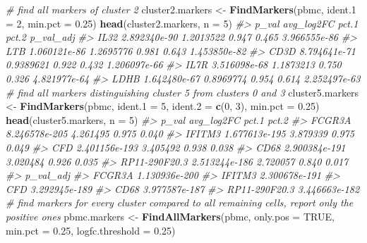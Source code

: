\documentclass[
]{book}
\newenvironment{Shaded}{\begin{snugshade}}{\end{snugshade}}
\newcommand{\AttributeTok}[1]{\textcolor[rgb]{0.13,0.29,0.53}{#1}}
\newcommand{\CommentTok}[1]{\textcolor[rgb]{0.56,0.35,0.01}{\textit{#1}}}
\newcommand{\ConstantTok}[1]{\textcolor[rgb]{0.56,0.35,0.01}{#1}}
\newcommand{\DecValTok}[1]{\textcolor[rgb]{0.00,0.00,0.81}{#1}}
\newcommand{\FloatTok}[1]{\textcolor[rgb]{0.00,0.00,0.81}{#1}}
\newcommand{\FunctionTok}[1]{\textcolor[rgb]{0.13,0.29,0.53}{\textbf{#1}}}
\newcommand{\NormalTok}[1]{#1}
\newcommand{\OtherTok}[1]{\textcolor[rgb]{0.56,0.35,0.01}{#1}}
\begin{document}
\begin{Shaded}
\begin{Highlighting}[]
\CommentTok{\# find all markers of cluster 2}
\NormalTok{cluster2.markers }\OtherTok{\textless{}{-}} \FunctionTok{FindMarkers}\NormalTok{(pbmc, }\AttributeTok{ident.1 =} \DecValTok{2}\NormalTok{, }\AttributeTok{min.pct =} \FloatTok{0.25}\NormalTok{)}
\FunctionTok{head}\NormalTok{(cluster2.markers, }\AttributeTok{n =} \DecValTok{5}\NormalTok{)}
\CommentTok{\#\textgreater{}             p\_val avg\_log2FC pct.1 pct.2    p\_val\_adj}
\CommentTok{\#\textgreater{} IL32 2.892340e{-}90  1.2013522 0.947 0.465 3.966555e{-}86}
\CommentTok{\#\textgreater{} LTB  1.060121e{-}86  1.2695776 0.981 0.643 1.453850e{-}82}
\CommentTok{\#\textgreater{} CD3D 8.794641e{-}71  0.9389621 0.922 0.432 1.206097e{-}66}
\CommentTok{\#\textgreater{} IL7R 3.516098e{-}68  1.1873213 0.750 0.326 4.821977e{-}64}
\CommentTok{\#\textgreater{} LDHB 1.642480e{-}67  0.8969774 0.954 0.614 2.252497e{-}63}
\CommentTok{\# find all markers distinguishing cluster 5 from clusters 0 and 3}
\NormalTok{cluster5.markers }\OtherTok{\textless{}{-}} \FunctionTok{FindMarkers}\NormalTok{(pbmc, }\AttributeTok{ident.1 =} \DecValTok{5}\NormalTok{, }\AttributeTok{ident.2 =} \FunctionTok{c}\NormalTok{(}\DecValTok{0}\NormalTok{, }\DecValTok{3}\NormalTok{), }\AttributeTok{min.pct =} \FloatTok{0.25}\NormalTok{)}
\FunctionTok{head}\NormalTok{(cluster5.markers, }\AttributeTok{n =} \DecValTok{5}\NormalTok{)}
\CommentTok{\#\textgreater{}                       p\_val avg\_log2FC pct.1 pct.2}
\CommentTok{\#\textgreater{} FCGR3A        8.246578e{-}205   4.261495 0.975 0.040}
\CommentTok{\#\textgreater{} IFITM3        1.677613e{-}195   3.879339 0.975 0.049}
\CommentTok{\#\textgreater{} CFD           2.401156e{-}193   3.405492 0.938 0.038}
\CommentTok{\#\textgreater{} CD68          2.900384e{-}191   3.020484 0.926 0.035}
\CommentTok{\#\textgreater{} RP11{-}290F20.3 2.513244e{-}186   2.720057 0.840 0.017}
\CommentTok{\#\textgreater{}                   p\_val\_adj}
\CommentTok{\#\textgreater{} FCGR3A        1.130936e{-}200}
\CommentTok{\#\textgreater{} IFITM3        2.300678e{-}191}
\CommentTok{\#\textgreater{} CFD           3.292945e{-}189}
\CommentTok{\#\textgreater{} CD68          3.977587e{-}187}
\CommentTok{\#\textgreater{} RP11{-}290F20.3 3.446663e{-}182}
\CommentTok{\# find markers for every cluster compared to all remaining cells, report only the positive ones}
\NormalTok{pbmc.markers }\OtherTok{\textless{}{-}} \FunctionTok{FindAllMarkers}\NormalTok{(pbmc, }\AttributeTok{only.pos =} \ConstantTok{TRUE}\NormalTok{, }\AttributeTok{min.pct =} \FloatTok{0.25}\NormalTok{, }\AttributeTok{logfc.threshold =} \FloatTok{0.25}\NormalTok{)}

\end{Highlighting}
\end{Shaded}
\end{document}
